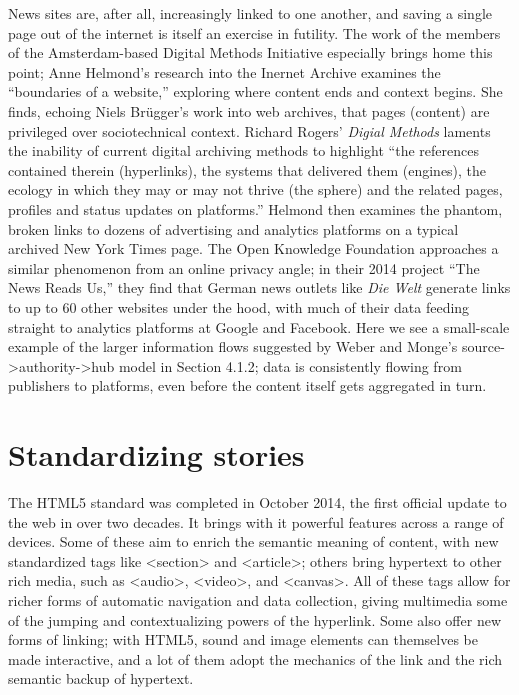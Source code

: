 News sites are, after all, increasingly linked to one another, and saving a single page out of the internet is itself an exercise in futility. The work of the members of the Amsterdam-based Digital Methods Initiative especially brings home this point; Anne Helmond's research into the Inernet Archive examines the ``boundaries of a website,'' exploring where content ends and context begins. She finds, echoing Niels Br\"{u}gger's work into web archives, that pages (content) are privileged over sociotechnical context. Richard Rogers' \emph{Digial Methods} laments the inability of current digital archiving methods to highlight ``the references contained therein (hyperlinks), the systems that delivered them (engines), the ecology in which they may or may not thrive (the sphere) and the related pages, profiles and status updates on platforms.''\autocite{helmond_examining_2013, rogers_digital_2013} Helmond then examines the phantom, broken links to dozens of advertising and analytics platforms on a typical archived New York Times page. The Open Knowledge Foundation approaches a similar phenomenon from an online privacy angle; in their 2014 project ``The News Reads Us,'' they find that German news outlets like \emph{Die Welt} generate links to up to 60 other websites under the hood, with much of their data feeding straight to analytics platforms at Google and Facebook.\autocite{????_news_2014} Here we see a small-scale example of the larger information flows suggested by Weber and Monge's source->authority->hub model in Section 4.1.2; data is consistently flowing from publishers to platforms, even before the content itself gets aggregated in turn.

\section{Standardizing stories}

The HTML5 standard was completed in October 2014, the first official update to the web in over two decades. It brings with it powerful features across a range of devices. Some of these aim to enrich the semantic meaning of content, with new standardized tags like <section> and <article>; others bring hypertext to other rich media, such as <audio>, <video>, and <canvas>. All of these tags allow for richer forms of automatic navigation and data collection, giving multimedia some of the jumping and contextualizing powers of the hyperlink. Some also offer new forms of linking; with HTML5, sound and image elements can themselves be made interactive, and a lot of them adopt the mechanics of the link and the rich semantic backup of hypertext.

